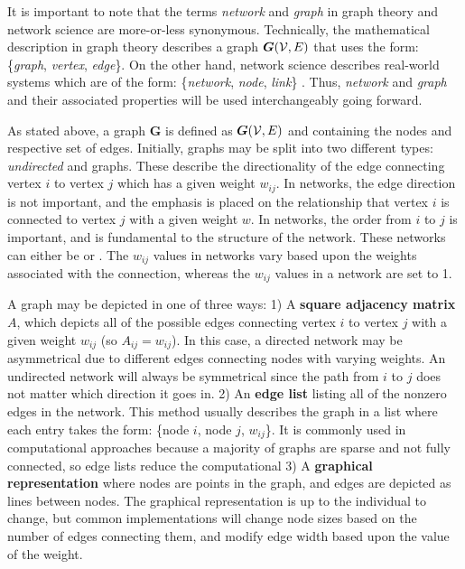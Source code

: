 It is important to note that the terms \textit{network} and \textit{graph} in graph theory and network science are more-or-less synonymous. Technically, the mathematical description in graph theory describes a graph $\bm{G}(\mathcal{V},E)$ that uses the form: \{\textit{graph}, \textit{vertex}, \textit{edge}\}. On the other hand, network science describes real-world systems which are of the form: \{\textit{network}, \textit{node}, \textit{link}\} \citep{Barabasi2016}. Thus, \textit{network} and \textit{graph} and their associated properties will be used interchangeably going forward. 

As stated above, a graph $\bm{G}$ is defined as $\bm{G}(\mathcal{V},E)$ and containing the nodes and respective set of edges. Initially, graphs may be split into two different types: \textit{undirected} and  graphs. These describe the directionality of the edge connecting vertex $i$ to vertex $j$ which has a given weight $w_{ij}$. In  networks, the edge direction is not important, and the emphasis is placed on the relationship that vertex $i$ is connected to vertex $j$ with a given weight $w$. In  networks, the order from $i$ to $j$ is important, and is fundamental to the structure of the network. These networks can either be  or . The $w_{ij}$ values in  networks vary based upon the weights associated with the connection, whereas the $w_{ij}$ values in a  network are set to 1. 

A graph may be depicted in one of three ways: 1) A \textbf{square adjacency matrix} $A$, which depicts all of the possible edges connecting vertex $i$ to vertex $j$ with a given weight $w_{ij}$ (so $A_{ij} = w_{ij}$). In this case, a directed network may be asymmetrical due to different edges connecting nodes with varying weights. An undirected network will always be symmetrical since the path from $i$ to $j$ does not matter which direction it goes in. 2) An \textbf{edge list} listing all of the nonzero edges in the network. This method usually describes the graph in a list where each entry takes the form: \{node $i$, node $j$, $w_{ij}$\}. It is commonly used in computational approaches because a majority of graphs are sparse and not fully connected, so edge lists reduce the computational  3) A \textbf{graphical representation} where nodes are points in the graph, and edges are depicted as lines between nodes. The graphical representation is up to the individual to change, but common implementations will change node sizes based on the number of edges connecting them, and modify edge width based upon the value of the weight.

